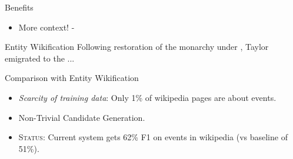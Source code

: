 \begin{frame}{Benefits}
  \begin{itemize}
  \item More context! - 
  \end{itemize}
  \begin{block}{Entity Wikification}
    Following { restoration} of the monarchy under , Taylor emigrated to the ...
  \end{block}
\end{frame}

\begin{frame}{Comparison with Entity Wikification}
  \begin{itemize}[<+->]
  \item \emph{Scarcity of training data}: Only 1\% of wikipedia pages are about events.
  \item Non-Trivial Candidate Generation.
  \item \textsc{Status:} Current system gets 62\% F1 on events in wikipedia (vs baseline of 51\%).
  \end{itemize}
\end{frame}






